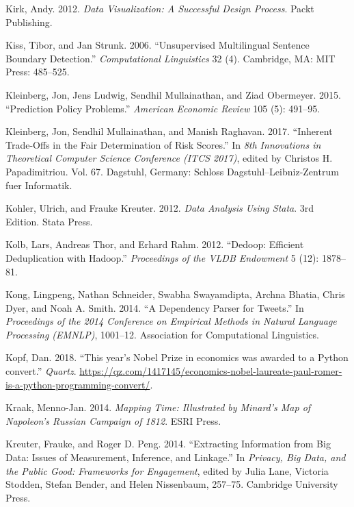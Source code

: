 \documentclass[]{krantz}
\begin{document}
\hypertarget{ref-kirk2012data}{}
Kirk, Andy. 2012. \emph{Data Visualization: A Successful Design
Process}. Packt Publishing.

\hypertarget{ref-kiss-06}{}
Kiss, Tibor, and Jan Strunk. 2006. ``Unsupervised Multilingual Sentence
Boundary Detection.'' \emph{Computational Linguistics} 32 (4).
Cambridge, MA: MIT Press: 485--525.

\hypertarget{ref-Kleinberg2015}{}
Kleinberg, Jon, Jens Ludwig, Sendhil Mullainathan, and Ziad Obermeyer.
2015. ``Prediction Policy Problems.'' \emph{American Economic Review}
105 (5): 491--95.

\hypertarget{ref-kleinberg2017}{}
Kleinberg, Jon, Sendhil Mullainathan, and Manish Raghavan. 2017.
``Inherent Trade-Offs in the Fair Determination of Risk Scores.'' In
\emph{8th Innovations in Theoretical Computer Science Conference (ITCS
2017)}, edited by Christos H. Papadimitriou. Vol. 67. Dagstuhl, Germany:
Schloss Dagstuhl--Leibniz-Zentrum fuer Informatik.

\hypertarget{ref-kohler2012datenanalyse}{}
Kohler, Ulrich, and Frauke Kreuter. 2012. \emph{Data Analysis Using
Stata}. 3rd Edition. Stata Press.

\hypertarget{ref-kolb2012}{}
Kolb, Lars, Andreas Thor, and Erhard Rahm. 2012. ``Dedoop: Efficient
Deduplication with Hadoop.'' \emph{Proceedings of the VLDB Endowment} 5
(12): 1878--81.

\hypertarget{ref-kong-14}{}
Kong, Lingpeng, Nathan Schneider, Swabha Swayamdipta, Archna Bhatia,
Chris Dyer, and Noah A. Smith. 2014. ``A Dependency Parser for Tweets.''
In \emph{Proceedings of the 2014 Conference on Empirical Methods in
Natural Language Processing (EMNLP)}, 1001--12. Association for
Computational Linguistics.

\hypertarget{ref-Kopf}{}
Kopf, Dan. 2018. ``This year's Nobel Prize in economics was awarded to a
Python convert.'' \emph{Quartz}.
\url{https://qz.com/1417145/economics-nobel-laureate-paul-romer-is-a-python-programming-convert/}.

\hypertarget{ref-Kraak2014}{}
Kraak, Menno-Jan. 2014. \emph{Mapping Time: Illustrated by Minard's Map
of Napoleon's Russian Campaign of 1812}. ESRI Press.

\hypertarget{ref-kreuter201412}{}
Kreuter, Frauke, and Roger D. Peng. 2014. ``Extracting Information from
Big Data: Issues of Measurement, Inference, and Linkage.'' In
\emph{Privacy, Big Data, and the Public Good: Frameworks for
Engagement}, edited by Julia Lane, Victoria Stodden, Stefan Bender, and
Helen Nissenbaum, 257--75. Cambridge University Press.
\end{document}
